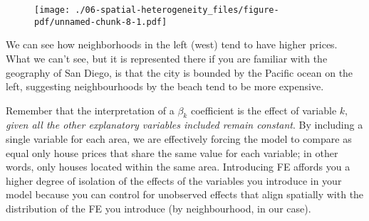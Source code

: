 \documentclass[
  letterpaper,
  krantz2]{style/krantz}
\newenvironment{Shaded}{\begin{snugshade}}{\end{snugshade}}
\newcommand{\AttributeTok}[1]{\textcolor[rgb]{0.40,0.45,0.13}{#1}}
\newcommand{\CommentTok}[1]{\textcolor[rgb]{0.37,0.37,0.37}{#1}}
\newcommand{\FunctionTok}[1]{\textcolor[rgb]{0.28,0.35,0.67}{#1}}
\newcommand{\NormalTok}[1]{\textcolor[rgb]{0.00,0.23,0.31}{#1}}
\newcommand{\OtherTok}[1]{\textcolor[rgb]{0.00,0.23,0.31}{#1}}
\newcommand{\SpecialCharTok}[1]{\textcolor[rgb]{0.37,0.37,0.37}{#1}}
\newcommand{\StringTok}[1]{\textcolor[rgb]{0.13,0.47,0.30}{#1}}
\begin{document}
\begin{Shaded}
\end{Shaded}

\begin{figure}[H]

{\centering \texttt{[image: ./06-spatial-heterogeneity\_files/figure-pdf/unnamed-chunk-8-1.pdf]}

}

\end{figure}

We can see how neighborhoods in the left (west) tend to have higher
prices. What we can't see, but it is represented there if you are
familiar with the geography of San Diego, is that the city is bounded by
the Pacific ocean on the left, suggesting neighbourhoods by the beach
tend to be more expensive.

Remember that the interpretation of a \(\beta_k\) coefficient is the
effect of variable \(k\), \emph{given all the other explanatory
variables included remain constant}. By including a single variable for
each area, we are effectively forcing the model to compare as equal only
house prices that share the same value for each variable; in other
words, only houses located within the same area. Introducing FE affords
you a higher degree of isolation of the effects of the variables you
introduce in your model because you can control for unobserved effects
that align spatially with the distribution of the FE you introduce (by
neighbourhood, in our case).
\end{document}
